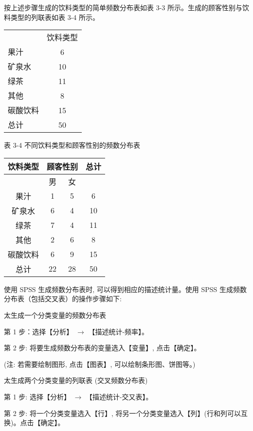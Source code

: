 \documentclass[10pt]{article}
\begin{document}
\begin{CJK*}{UTF8}{bsmi}
按上述步骤生成的饮料类型的简单频数分布表如表 3-3 所示。生成的顾客性别与饮料类型的列联表如表 3-4 所示。

\begin{center}
\begin{tabular}{lc}
\hline
 & 饮料类型 \\
果汁 & 6 \\
矿泉水 & 10 \\
绿茶 & 11 \\
其他 & 8 \\
碳酸饮料 & 15 \\
\hline
总计 & 50 \\
\hline
\end{tabular}
\end{center}

表 3-4 不同饮料类型和顾客性别的频数分布表

\begin{center}
\begin{tabular}{|c|c|c|c|}
\hline
\multirow{2}{*}{饮料类型} & \multicolumn{2}{|c|}{顾客性别} & \multirow{2}{*}{总计} \\
\hline
 & 男 & 女 &  \\
\hline
果汁 & 1 & 5 & 6 \\
\hline
矿泉水 & 6 & 4 & 10 \\
\hline
绿茶 & 7 & 4 & 11 \\
\hline
其他 & 2 & 6 & 8 \\
\hline
碳酸饮料 & 6 & 9 & 15 \\
\hline
总计 & 22 & 28 & 50 \\
\hline
\end{tabular}
\end{center}

使用 SPSS 生成频数分布表时, 可以得到相应的描述统计量。使用 SPSS 生成频数分布表（包括交叉表）的操作步骤如下:

太生成一个分类变量的频数分布表

第 1 步：选择【分析】 $\rightarrow$ 【描述统计-频率】。

第 2 步: 将要生成频数分布表的变量选入【变量】, 点击【确定】。

(注: 若需要绘制图形, 点击【图表】, 可以绘制条形图、饼图等。)

太生成两个分类变量的列联表 (交叉频数分布表)

第 1 步: 选择【分析】 $\rightarrow$ 【描述统计-交又表】。

第 2 步: 将一个分类变量选入【行】, 将另一个分类变量选入【列】(行和列可以互换)。点击【确定】。


\end{CJK*}
\end{document}
